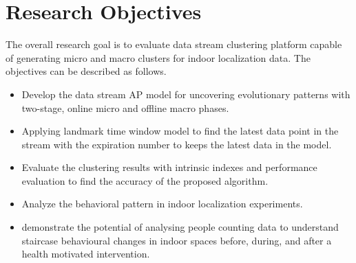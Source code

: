 




\section{Research Objectives}

The overall research goal is to evaluate data stream clustering platform capable of generating micro and macro clusters for indoor localization data. The objectives can be described as follows. 

\begin{itemize}

    \item Develop the data stream AP model for uncovering evolutionary patterns with two-stage, online micro and offline macro phases.
     \item Applying landmark time window model to find the latest data point in the stream with the expiration number to keeps the latest data in the model.
    \item Evaluate the clustering results with intrinsic indexes and performance evaluation to find the accuracy of the proposed algorithm.  
    \item Analyze the behavioral pattern in indoor localization experiments.
    \item demonstrate the potential of analysing people counting data to understand staircase behavioural changes in indoor spaces before, during, and after a health motivated intervention.
\end{itemize}  





